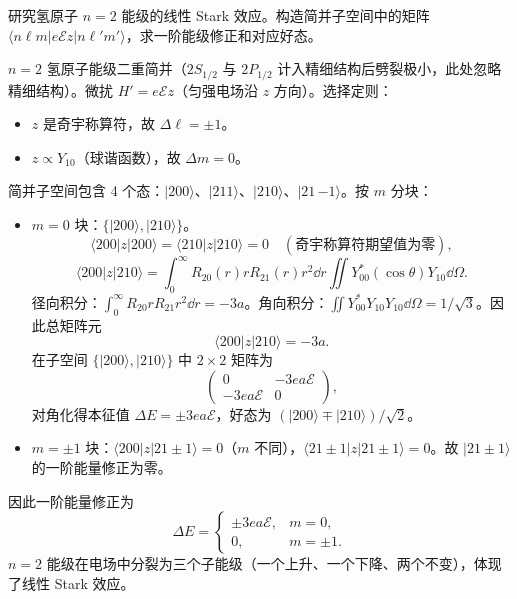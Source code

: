 \begin{question}
研究氢原子 $n=2$ 能级的线性 Stark 效应。构造简并子空间中的矩阵 $\langle n\ell m|e\mathcal Ez|n\ell' m'\rangle$，求一阶能级修正和对应好态。
\end{question}
\begin{solution}
$n=2$ 氢原子能级二重简并（$2S_{1/2}$ 与 $2P_{1/2}$ 计入精细结构后劈裂极小，此处忽略精细结构）。微扰 $H'=e\mathcal Ez$（匀强电场沿 $z$ 方向）。选择定则：
\begin{itemize}
\item $z$ 是奇宇称算符，故 $\Delta\ell=\pm1$。
\item $z\propto Y_{10}$（球谐函数），故 $\Delta m=0$。
\end{itemize}

简并子空间包含 4 个态：$|200\rangle$、$|211\rangle$、$|210\rangle$、$|21\,{-1}\rangle$。按 $m$ 分块：
\begin{itemize}
\item $m=0$ 块：$\{|200\rangle,|210\rangle\}$。
  \[
  \langle200|z|200\rangle = \langle210|z|210\rangle = 0\quad(\text{奇宇称算符期望值为零}),
  \]
  \[
  \langle200|z|210\rangle = \int_0^\infty R_{20}(r)r R_{21}(r)r^2\dd r\iint Y_{00}^*(\cos\theta)Y_{10}\dd\Omega.
  \]
  径向积分：$\int_0^\infty R_{20}rR_{21}r^2\dd r = -3a$。角向积分：$\iint Y_{00}^*Y_{10}Y_{10}\dd\Omega = 1/\sqrt3$。因此总矩阵元
  \[
  \langle200|z|210\rangle = -3a.
  \]
  在子空间 $\{|200\rangle,|210\rangle\}$ 中 $2\times2$ 矩阵为
  \[
  \begin{pmatrix}0 & -3ea\mathcal E\\ -3ea\mathcal E & 0\end{pmatrix},
  \]
  对角化得本征值 $\Delta E = \pm 3ea\mathcal E$，好态为 $(|200\rangle\mp|210\rangle)/\sqrt2$。

\item $m=\pm1$ 块：$\langle200|z|21\pm1\rangle = 0$（$m$ 不同），$\langle21\pm1|z|21\pm1\rangle=0$。故 $|21\pm1\rangle$ 的一阶能量修正为零。
\end{itemize}

因此一阶能量修正为
\[
\boxed{\Delta E = \begin{cases}
\pm 3ea\mathcal E, & m=0,\\ 0, & m=\pm1.
\end{cases}}
\]
$n=2$ 能级在电场中分裂为三个子能级（一个上升、一个下降、两个不变），体现了线性 Stark 效应。
\end{solution}

